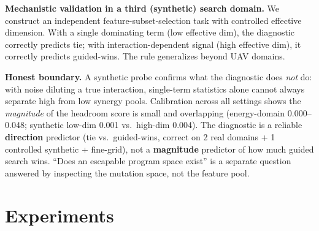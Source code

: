 \documentclass{article}
\begin{document}
\textbf{Mechanistic validation in a third (synthetic) search domain.} We construct an
independent feature-subset-selection task with controlled effective dimension. With a
single dominating term (low effective dim), the diagnostic correctly predicts tie; with
interaction-dependent signal (high effective dim), it correctly predicts guided-wins. The
rule generalizes beyond UAV domains.

\textbf{Honest boundary.} A synthetic probe confirms what the diagnostic does \emph{not}
do: with noise diluting a true interaction, single-term statistics alone cannot always
separate high from low synergy pools. Calibration across all settings shows the
\emph{magnitude} of the headroom score is small and overlapping (energy-domain
0.000--0.048; synthetic low-dim 0.001 vs.\ high-dim 0.004). The diagnostic is a reliable
\textbf{direction} predictor (tie vs.\ guided-wins, correct on 2 real domains + 1
controlled synthetic + fine-grid), not a \textbf{magnitude} predictor of how much guided
search wins. ``Does an escapable program space exist'' is a separate question answered by
inspecting the mutation space, not the feature pool.

\section{Experiments}
\label{sec:exp}
\end{document}
